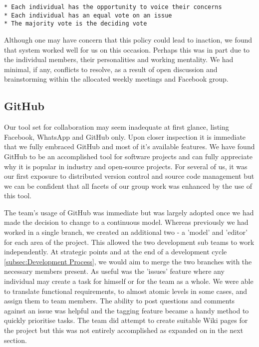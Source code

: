 \begin{lstlisting}[caption={Decision Making Agreement}]
* Each individual has the opportunity to voice their concerns
* Each individual has an equal vote on an issue
* The majority vote is the deciding vote
\end{lstlisting}
 
Although one may have concern that this policy could lead to inaction, we found that system worked well for us on this occasion.  Perhaps this was in part due to the individual members, their personalities and working mentality. We had minimal, if any, conflicts to resolve, as a result of open discussion and brainstorming within the allocated weekly meetings and Facebook group.

\subsection{GitHub}
Our tool set for collaboration may seem inadequate at first glance, listing Facebook, WhatsApp and GitHub only. Upon closer inspection it is immediate that we fully embraced GitHub and most of it's available features. We have found GitHub to be an accomplished tool for software projects and can fully appreciate why it is popular in industry and open-source projects. For several of us, it was our first exposure to distributed version control and source code management but we can be confident that all facets of our group work was enhanced by the use of this tool.

The team's usage of GitHub was immediate but was largely adopted once we had made the decision to change to a continuous model.  Whereas previously we had worked in a single branch, we created an additional two - a 'model' and 'editor' for each area of the project.  This allowed the two development sub teams to work independently. At strategic points and at the end of a development cycle \ref{subsec:Development Process}, we would aim to merge the two branches with the necessary members present. As useful was the 'issues' feature where any individual may create a task for himself or for the team as a whole. We were able to translate functional requirements, to almost atomic levels in some cases, and assign them to team members. The ability to post questions and comments against an issue was helpful and the tagging feature became a handy method to quickly prioritise tasks. The team  did attempt to create suitable Wiki pages for the project but this was not entirely accomplished as expanded on in the next section.

